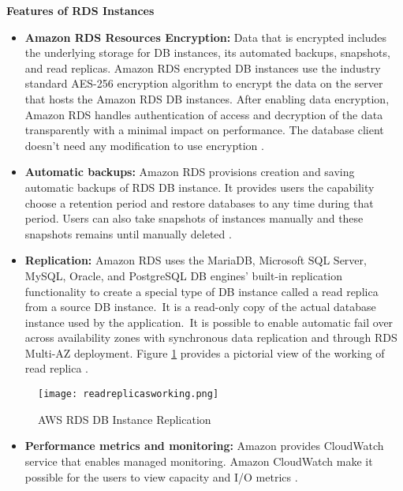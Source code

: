         {\textbf{Features of RDS Instances}
\begin{itemize}
    \item \textbf{Amazon RDS Resources Encryption:} Data that is encrypted includes the underlying storage for DB instances, its automated backups, snapshots, and read replicas. Amazon RDS encrypted DB instances use the industry standard AES-256 encryption algorithm to encrypt the data on the server that hosts the Amazon RDS DB instances. After enabling data encryption, Amazon RDS handles authentication of access and decryption of the data transparently with a minimal impact on performance. The database client doesn’t need any modification to use encryption \cite{35}.
\end{itemize}
\begin{itemize}
    \item \textbf{Automatic backups:} Amazon RDS provisions creation and saving automatic backups of RDS DB instance.
    It
    provides users the capability choose a retention period and restore databases to any time during that period.
    Users can also take snapshots of instances manually and these snapshots remains until manually deleted \cite{71}.
\end{itemize}
\begin{itemize}
    \item \textbf{Replication:} Amazon RDS uses the MariaDB, Microsoft SQL Server, MySQL, Oracle, and PostgreSQL DB engines' built-in replication functionality to create a special type of DB instance called a read replica from a source DB instance.\         It is a read-only copy
    of the
    actual database instance used by the application.\         It is possible to enable automatic fail over across availability
    zones with synchronous data replication and through RDS Multi-AZ deployment.
    Figure \ref{fig:readreplicasworking} provides a pictorial view of the working of read replica \cite{35}.
\end{itemize}
\begin{figure}
    \centering
    \texttt{[image: readreplicasworking.png]}
    \caption{AWS RDS DB Instance Replication}
    \label{fig:readreplicasworking}
\end{figure}
\begin{itemize}
    \item \textbf{Performance metrics and monitoring:} Amazon provides CloudWatch service that enables managed
    monitoring.
    Amazon CloudWatch make it possible for the users to view capacity and I/O metrics \cite{35}.
\end{itemize}



}
